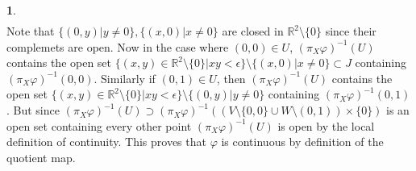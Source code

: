 \documentclass[10.5pt]{article}
\theoremstyle{definition}
\newtheorem{pb}{}
\newcommand{\set}[1]{\{#1\}}
\begin{document}
\begin{pb}
\begin{align*}
        \end{align*}
       Note that \(\set{(0,y) \vert y \neq 0}, \set{(x,0) \vert x \neq 0}\) are closed in \(\mathbb{R}^2 \setminus \set{0}\) since their complemets are open.
        Now in the case where \((0,0) \in U\), \((\pi_X \varphi)^{-1}(U)\) contains the open set 
        \(\set{(x,y) \in \mathbb{R}^2\setminus \set{0}\vert xy < \epsilon} \setminus \set{(x,0) \vert x \neq 0} \subset J\)
        containing \((\pi_X \varphi)^{-1}(0,0)\). Similarly if \((0,1) \in U\), then 
        \((\pi_X \varphi)^{-1}(U)\) contains the open set \(\set{(x,y) \in \mathbb{R}^2\setminus \set{0}\vert xy < \epsilon} \setminus \set{(0,y) \vert y \neq 0}\)
        containing \((\pi_X \varphi)^{-1}(0,1)\). But since \((\pi_X \varphi)^{-1}(U) \supset (\pi_X \varphi)^{-1}((V \setminus \set{0,0} \cup W \setminus (0,1)) \times \set{0})\) is an open set containing
        every other point \((\pi_X \varphi)^{-1}(U)\) is open by the local definition of continuity. This proves that \(\varphi\) is continuous by definition of the quotient map.


\end{pb}
\end{document}
